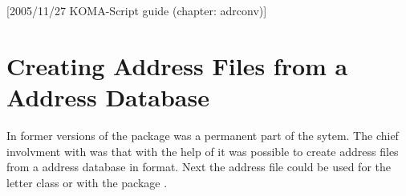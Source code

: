 %
%
%
%
%
%
%
%
% 
%
%
%
%

[{2005/11/27 KOMA-Script guide (chapter:
  adrconv)}]

\chapter{Creating Address Files from a Address Database}%
%
%
%

In former versions of \KOMAScript{} the package  was a
permanent part of the \KOMAScript{} sytem.  The chief involvment with
\KOMAScript{} was that with the help of  it was possible to
create address files from a address database in \BibTeX{} format.  Next the
address file could be used for the \KOMAScript{} letter class or with the
package .

